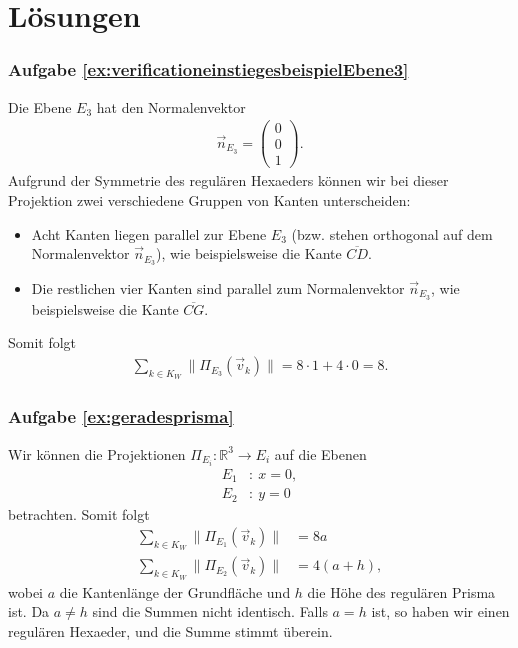 \section{Lösungen}

\subsubsection*{Aufgabe \ref{ex:verificationeinstiegesbeispielEbene3}}
Die Ebene $E_3$ hat den Normalenvektor 
\begin{align}
    \vec{n}_{E_3} = \begin{pmatrix} 0 \\ 0 \\ 1 \end{pmatrix} .\nonumber
\end{align}
Aufgrund der Symmetrie des regulären Hexaeders können wir bei dieser Projektion zwei verschiedene Gruppen von Kanten unterscheiden:
\begin{itemize}
    \item Acht Kanten liegen parallel zur Ebene $E_3$ (bzw. stehen orthogonal auf dem Normalenvektor $\vec{n}_{E_3}$), wie beispielsweise die Kante $\overline{CD}$.
    \item Die restlichen vier Kanten sind parallel zum Normalenvektor $\vec{n}_{E_3}$, wie beispielsweise die Kante $\overline{CG}$.
\end{itemize}
Somit folgt
\begin{align}
    \sum_{k \in K_W} \|\Pi_{E_3}(\vec{v}_k)\| = 8 \cdot 1 + 4 \cdot  0= 8. \nonumber
\end{align}

\subsubsection*{Aufgabe \ref{ex:geradesprisma}}
Wir können die Projektionen $\Pi_{E_i}: \mathbb{R}^3 \rightarrow E_i$ auf die Ebenen
\begin{align}
    E_1&: \ x=0, \nonumber \\
    E_2&: \ y=0 \nonumber
\end{align}
betrachten. Somit folgt
\begin{align}
    \sum_{k \in K_W} \|\Pi_{E_1}(\vec{v}_k)\| &= 8a \nonumber \\
    \sum_{k \in K_W} \|\Pi_{E_2}(\vec{v}_k)\| &= 4(a + h), \nonumber
\end{align}
wobei $a$ die Kantenlänge der Grundfläche und $h$ die Höhe des regulären Prisma ist. Da $a \neq h$ sind die Summen nicht identisch. Falls $a=h$ ist, so haben wir einen regulären Hexaeder, und die Summe stimmt überein.
